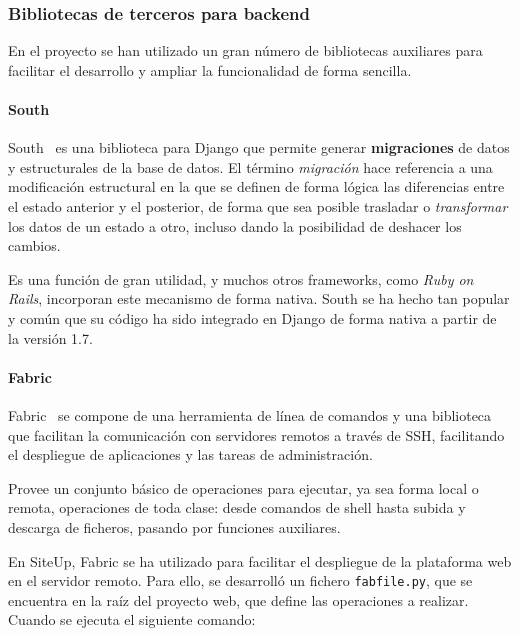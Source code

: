 \subsubsection{Bibliotecas de terceros para backend}

En el proyecto se han utilizado un gran número de bibliotecas auxiliares para
facilitar el desarrollo y ampliar la funcionalidad de forma sencilla.

\paragraph{South}

South~\cite{south} es una biblioteca para Django que permite generar
\textbf{migraciones} de datos y estructurales de la base de datos. El término
\textit{migración} hace referencia a una modificación estructural en la que se
definen de forma lógica las diferencias entre el estado anterior y el posterior,
de forma que sea posible trasladar o \textit{transformar} los datos de un estado
a otro, incluso dando la posibilidad de deshacer los cambios. 

Es una función de gran utilidad, y muchos otros frameworks, como \textit{Ruby on
  Rails}, incorporan este mecanismo de forma nativa. South se ha hecho tan
popular y común que su código ha sido integrado en Django de forma nativa a
partir de la versión 1.7.

\paragraph{Fabric}

Fabric~\cite{fabric} se compone de una herramienta de línea de comandos y una
biblioteca que facilitan la comunicación con servidores remotos a través de
SSH, facilitando el despliegue de aplicaciones y las tareas de administración.

Provee un conjunto básico de operaciones para ejecutar, ya sea forma local o
remota, operaciones de toda clase: desde comandos de shell hasta subida y
descarga de ficheros, pasando por funciones auxiliares.

En SiteUp, Fabric se ha utilizado para facilitar el despliegue de la plataforma
web en el servidor remoto. Para ello, se desarrolló un fichero
\texttt{fabfile.py}, que se encuentra en la raíz del proyecto web, que define
las operaciones a realizar. Cuando se ejecuta el siguiente comando:


